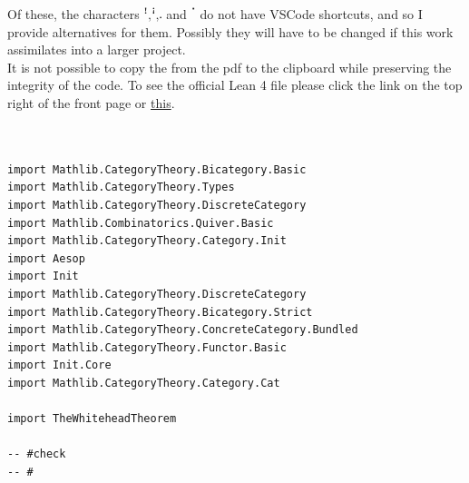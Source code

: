 \documentclass{book}
\theoremstyle{definition}
\newcounter{lcounter}
\begin{document}
Of these, the characters $\texttt{ꜝ,ꜞ,𛲔}$ and $\texttt{ॱ}$ do not have VSCode shortcuts, and so I provide alternatives for them. Possibly they will have to be changed if this work assimilates into a larger project.\\

It is not possible to copy the from the pdf to the clipboard while preserving the integrity of the code. To see the official Lean 4 file please click the link on the top right of the front page or \href{https://github.com/linlib/CategoryTheory/tree/main}{this}.



\begin{center}
\begin{tcolorbox}[width=5in,colback={white},title={\begin{center}\texttt{Lean \thelcounter} \addtocounter{lcounter}{1}  \end{center}},colbacktitle=Blue,coltitle=black]
\begin{verbatim}


import Mathlib.CategoryTheory.Bicategory.Basic
import Mathlib.CategoryTheory.Types 
import Mathlib.CategoryTheory.DiscreteCategory
import Mathlib.Combinatorics.Quiver.Basic
import Mathlib.CategoryTheory.Category.Init
import Aesop
import Init
import Mathlib.CategoryTheory.DiscreteCategory
import Mathlib.CategoryTheory.Bicategory.Strict
import Mathlib.CategoryTheory.ConcreteCategory.Bundled
import Mathlib.CategoryTheory.Functor.Basic
import Init.Core
import Mathlib.CategoryTheory.Category.Cat

import TheWhiteheadTheorem

-- #check 
-- #

\end{verbatim}
\end{tcolorbox}
\end{center}


\newpage
\begin{center}

\pagecolor{white}
\color{black}




\end{center}

\thispagestyle{empty}




\newpage
\pagecolor{white}
\color{black}
\ \\
\ \\
\thispagestyle{empty}
\end{document}
